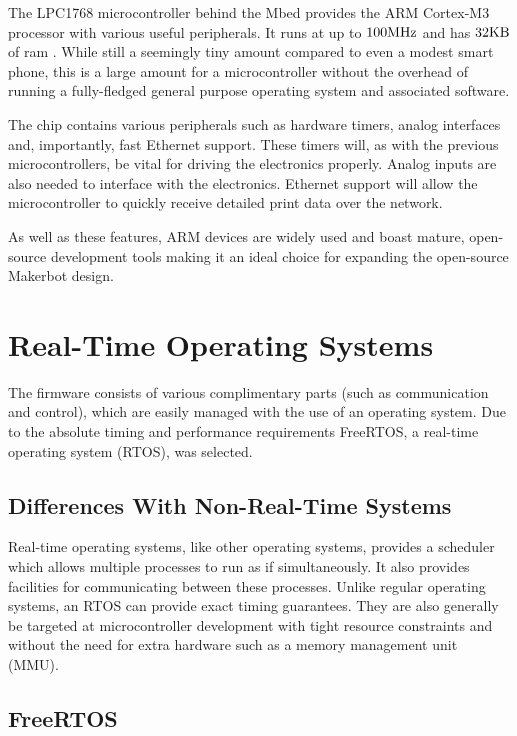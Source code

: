 			The LPC1768 microcontroller behind the Mbed provides the ARM Cortex-M3
			processor with various useful peripherals. It runs at up to $100\textrm{MHz}$ and
			has $32\textrm{KB}$ of ram \cite{lpc1768}.  While still a seemingly tiny amount
			compared to even a modest smart phone, this is a large amount for a
			microcontroller without the overhead of running a fully-fledged general
			purpose operating system and associated software.
			
			The chip contains various peripherals such as hardware timers, analog
			interfaces and, importantly, fast Ethernet support. These timers will, as
			with the previous microcontrollers, be vital for driving the electronics
			properly. Analog inputs are also needed to interface with the electronics.
			Ethernet support will allow the microcontroller to quickly receive
			detailed print data over the network.
			
			As well as these features, ARM devices are widely used and boast mature,
			open-source development tools making it an ideal choice for expanding the
			open-source Makerbot design.
			
	\section{Real-Time Operating Systems}
		
		The firmware consists of various complimentary parts (such as communication
		and control), which are easily managed with the use of an operating system.
		Due to the absolute timing and performance requirements FreeRTOS, a
		real-time operating system (RTOS), was selected.
		
		\subsection{Differences With Non-Real-Time Systems}
			
			Real-time operating systems, like other operating systems, provides a
			scheduler which allows multiple processes to run as if simultaneously. It
			also provides facilities for communicating between these processes. Unlike
			regular operating systems, an RTOS can provide exact timing guarantees.
			They are also generally be targeted at microcontroller development with
			tight resource constraints and without the need for extra hardware such as
			a memory management unit (MMU).
			
		\subsection{FreeRTOS}
			
